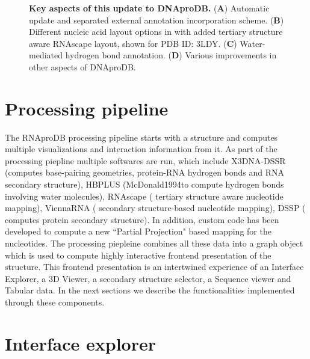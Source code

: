 \begin{center}
    \begin{figure}
        \caption[Key aspects of this update to DNAproDB.]{\textbf{Key aspects of this update to DNAproDB.} ({\bf A}) Automatic update and separated external annotation incorporation scheme.  ({\bf B})  Different nucleic acid layout options in with added tertiary structure aware RNAscape layout, shown for PDB ID: 3LDY. ({\bf C}) Water-mediated hydrogen bond annotation. ({\bf D}) Various improvements in other aspects of DNAproDB. }
  \label{fig:rnaprodb1}
\end{figure}
\end{center}

\section{Processing pipeline}
The RNAproDB processing pipeline starts with a structure and computes multiple visualizations and interaction information from it. As part of the processing piepline multiple softwares are run, which include X3DNA-DSSR (\citep{Lu2015}computes base-pairing geometries, protein-RNA hydrogen bonds and RNA secondary structure), HBPLUS (McDonald1994to compute hydrogen bonds involving water molecules), RNAscape (\citep{Mitra2024rnascape} tertiary structure aware nucleotide mapping), ViennaRNA (\citep{Lorenz2011} secondary structure-based nucleotide mapping), DSSP (\citep{joosten2010series, kabsch1983dictionary} computes protein secondary structure). In addition, custom code has been developed to compute a new ``Partial Projection" based mapping for the nucleotides. The processing piepleine combines all these data into a graph object which is used to compute highly interactive frontend presentation of the structure. This frontend presentation is an intertwined experience of an Interface Explorer, a 3D Viewer, a secondary structure selector, a Sequence viewer and Tabular data. In the next sections we describe the functionalities implemented through these components.

\section{Interface explorer}

